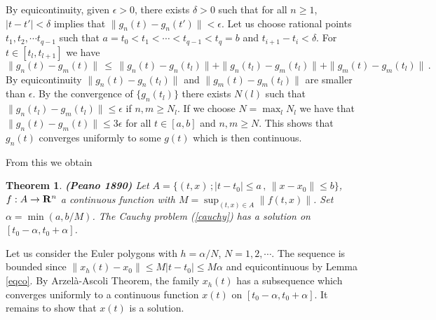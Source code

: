 \documentclass[12pt]{report}
\newcommand{\bR}{{\bf R}}
\newtheorem{theorem}{Theorem}[section]
\newcommand{\proof}{\noindent {\em Proof:~}}
\def\eqref#1{(\ref{#1})}
\def\qed{\hbox{\hskip 6pt\vrule width6pt height7pt depth1pt
    \hskip1pt}\bigskip}
\def\to{\rightarrow}
\begin{document}
By equicontinuity, given $\epsilon >0$, there exists $\delta > 0$ such
that for all $n \ge 1$, $|t-t'| < \delta $ implies that $\| g_n(t) -
g_n(t') \| < \epsilon$.  Let us choose rational points $t_1, t_2, \cdots
t_{q-1}$ such that $a=t_0 < t_1< \cdots < t_{q-1} < t_q=b$ and
$t_{i+1}-t_i < \delta$.  For $t \in [t_l, t_{l+1}]$ we have
\begin{equation}
\|g_n(t) - g_m(t)\| \,\le\, \|g_n(t) - g_n(t_l)\| + \|g_n(t_l) -
g_m(t_l)\| + \|g_m(t) - g_m(t_l)\| \,.
\end{equation}
By equicontinuity $\|g_n(t) - g_n(t_l)\|$ and $\|g_m(t) - g_m(t_l)\|$
are smaller than $\epsilon$. By the convergence of $\{g_n(t_l)\}$
there exists $N(l)$ such that $\|g_n(t_l) - g_m(t_l)\| \le \epsilon$
if $n,m \ge N_l$.  If we choose $N = \max_l {N_l}$ we have that
$\|g_n(t) - g_m(t)\| \le 3\epsilon$ for all $t \in [a,b]$ and $n,m \ge
N$.  This shows that $g_n(t)$ converges uniformly to some $g(t)$ which
is then continuous.  \hfill \qed


From this we obtain 

\begin{theorem}{\bf (Peano 1890)} 
Let $A= \{ (t,x) \,; |t-t_0| \le a \,,\, \|x-x_0\| \le b\}$, $f : A \to
\bR^n$ a continuous function with $M = \sup_{(t,x) \in A} \|f(t,x)\|$.
Set $\alpha = \min(a, b/M)$.  The Cauchy problem \eqref{cauchy}
has a solution on $[t_0 - \alpha, t_0 +\alpha]$.
\end{theorem}

\proof Let us consider the Euler polygons with $h=\alpha/N$,
$N=1,2,\cdots$. The sequence is bounded since $\|x_h(t) - x_0\| \le M
|t-t_0| \le M\alpha$ and equicontinuous by Lemma \ref{eqco}.  By
Arzel\`a-Ascoli Theorem, the family $x_h(t)$ has a subsequence which
converges uniformly to a continuous function $x(t)$ on $[t_0 - \alpha,
  t_0 +\alpha]$.  It remains to show that $x(t)$ is a solution.
\end{document}
